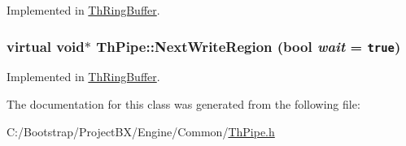 Implemented in \hyperlink{class_th_ring_buffer_fb5a911ce0ebb981ce95557101b84a83}{ThRingBuffer}.\hypertarget{class_th_pipe_09ce5149941b4e2aa33c8b1c07ea252b}{
\subsubsection[{NextWriteRegion}]{\setlength{\rightskip}{0pt plus 5cm}virtual void$\ast$ ThPipe::NextWriteRegion (bool {\em wait} = {\tt true})}}
\label{class_th_pipe_09ce5149941b4e2aa33c8b1c07ea252b}




Implemented in \hyperlink{class_th_ring_buffer_9a74853f2ccbc0d1b441efec8bb553d3}{ThRingBuffer}.

The documentation for this class was generated from the following file:\begin{CompactItemize}
\item 
C:/Bootstrap/ProjectBX/Engine/Common/\hyperlink{_th_pipe_8h}{ThPipe.h}\end{CompactItemize}
